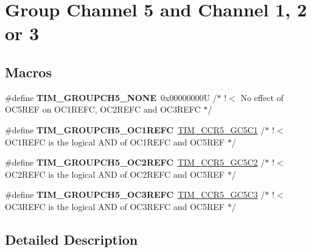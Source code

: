\hypertarget{group___t_i_m___group___channel5}{}\section{Group Channel 5 and Channel 1, 2 or 3}
\label{group___t_i_m___group___channel5}
\subsection*{Macros}
\begin{DoxyCompactItemize}
\item 
\mbox{\label{group___t_i_m___group___channel5_gac092061c7424b2d05e4788399139a45b}} 
\#define {\bfseries T\+I\+M\+\_\+\+G\+R\+O\+U\+P\+C\+H5\+\_\+\+N\+O\+NE}~0x00000000\+U                          /$\ast$ !$<$ No effect of O\+C5\+R\+E\+F on O\+C1\+R\+E\+F\+C, O\+C2\+R\+E\+F\+C and O\+C3\+R\+E\+F\+C $\ast$/
\item 
\mbox{\label{group___t_i_m___group___channel5_ga22bfca6a62255c5742471044f4b75815}} 
\#define {\bfseries T\+I\+M\+\_\+\+G\+R\+O\+U\+P\+C\+H5\+\_\+\+O\+C1\+R\+E\+FC}~\mbox{\hyperlink{group___peripheral___registers___bits___definition_gadce130a8f74c02de0f6e2f8cb0f16b6e}{T\+I\+M\+\_\+\+C\+C\+R5\+\_\+\+G\+C5\+C1}}                       /$\ast$ !$<$ O\+C1\+R\+E\+FC is the logical A\+ND of O\+C1\+R\+E\+FC and O\+C5\+R\+EF    $\ast$/
\item 
\mbox{\label{group___t_i_m___group___channel5_gad6d87bba35658aa23e11770bf2b6f53b}} 
\#define {\bfseries T\+I\+M\+\_\+\+G\+R\+O\+U\+P\+C\+H5\+\_\+\+O\+C2\+R\+E\+FC}~\mbox{\hyperlink{group___peripheral___registers___bits___definition_ga66b51c31aab6f353303cffb10593a027}{T\+I\+M\+\_\+\+C\+C\+R5\+\_\+\+G\+C5\+C2}}                       /$\ast$ !$<$ O\+C2\+R\+E\+FC is the logical A\+ND of O\+C2\+R\+E\+FC and O\+C5\+R\+EF    $\ast$/
\item 
\mbox{\label{group___t_i_m___group___channel5_gaf97b2fdd96918a9f224ce3524c77781b}} 
\#define {\bfseries T\+I\+M\+\_\+\+G\+R\+O\+U\+P\+C\+H5\+\_\+\+O\+C3\+R\+E\+FC}~\mbox{\hyperlink{group___peripheral___registers___bits___definition_gaaaf84ef0edc60a2bb1d724fd28ae522e}{T\+I\+M\+\_\+\+C\+C\+R5\+\_\+\+G\+C5\+C3}}                       /$\ast$ !$<$ O\+C3\+R\+E\+FC is the logical A\+ND of O\+C3\+R\+E\+FC and O\+C5\+R\+EF    $\ast$/
\end{DoxyCompactItemize}


\subsection{Detailed Description}
